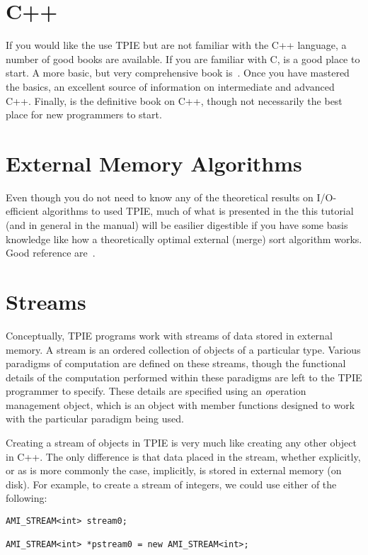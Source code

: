 \section{C++}

If you would like the use TPIE but are not familiar with the C++
language, a number of good books are available. If you are familiar with
C, \cite{pohl:c++} is a good place to start. A more basic, but
very comprehensive book is~\cite{deitel:c++}. Once you have mastered the
basics, \cite{meyers:effective} an excellent source of information on
intermediate and advanced C++.  Finally, \cite{ellis:arm} is the definitive
book on C++, though not necessarily the best place for new programmers to
start.

\section{External Memory Algorithms}

Even though you do not need to know any of the theoretical results on
I/O-efficient algorithms to used TPIE, much of what is presented in the
this tutorial (and in general in the manual) will be easilier digestible if
you have some basis knowledge like how a theoretically optimal external
(merge) sort algorithm works. Good reference
are~\cite{aggarwal:input,vitter:podssurvey,arge:gisbook}.


\section{Streams}


Conceptually, TPIE programs work with streams of data stored in external
memory. A stream is an ordered collection of objects of a particular type.
Various paradigms of computation are defined on these streams, though the
functional details of the computation performed within these paradigms are
left to the TPIE programmer to specify. These details are specified using
an {\emph operation management object},
which is an object with member functions designed to work with the
particular paradigm being used.

Creating a stream of objects in TPIE is very much like creating any other
object in C++. The only difference is that data placed in the stream,
whether explicitly, or as is more commonly the case, implicitly, is stored
in external memory (on disk). For example, to create a stream of integers,
we could use either of the following:
\begin{verbatim}
AMI_STREAM<int> stream0;

AMI_STREAM<int> *pstream0 = new AMI_STREAM<int>;
\end{verbatim}

